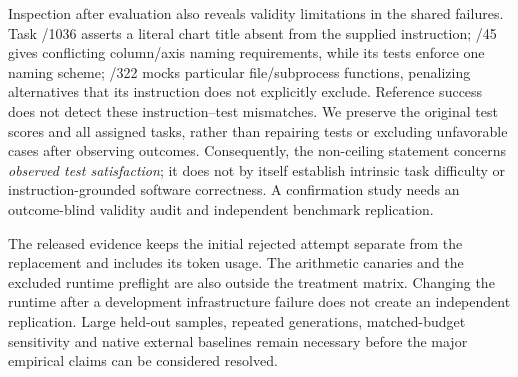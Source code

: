 Inspection after evaluation also reveals validity limitations in the shared failures. Task /1036 asserts a literal chart title absent from the supplied instruction; /45 gives conflicting column/axis naming requirements, while its tests enforce one naming scheme; /322 mocks particular file/subprocess functions, penalizing alternatives that its instruction does not explicitly exclude. Reference success does not detect these instruction--test mismatches. We preserve the original test scores and all assigned tasks, rather than repairing tests or excluding unfavorable cases after observing outcomes. Consequently, the non-ceiling statement concerns \emph{observed test satisfaction}; it does not by itself establish intrinsic task difficulty or instruction-grounded software correctness. A confirmation study needs an outcome-blind validity audit and independent benchmark replication.

The released evidence keeps the initial rejected attempt separate from the replacement and includes its token usage. The arithmetic canaries and the excluded runtime preflight are also outside the treatment matrix. Changing the runtime after a development infrastructure failure does not create an independent replication. Large held-out samples, repeated generations, matched-budget sensitivity and native external baselines remain necessary before the major empirical claims can be considered resolved.
